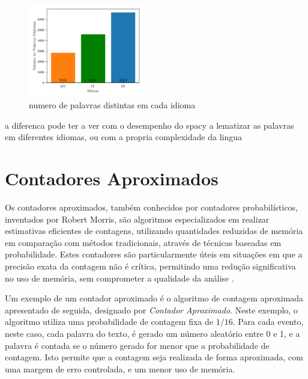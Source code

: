 \documentclass[mirror, portugues]{revdetua}
\begin{document}
\begin{figure}[H]
    \centering
    \includegraphics[width=0.45\textwidth]{../assets/exact_distinct_words.png}
    \caption{numero de palavras distintas em cada idioma}
    \label{fig:distinc_words}
\end{figure}

a diferenca pode ter a ver com o desempenho do spacy a lematizar as palavras em diferentes idiomas, ou com a propria complexidade da lingua 






\section{Contadores Aproximados}

Os contadores aproximados, também conhecidos por contadores probabilísticos, inventados por Robert Morris, são algoritmos especializados em realizar estimativas eficientes de contagens, utilizando quantidades reduzidas de memória em comparação com métodos tradicionais, através de técnicas baseadas em probabilidade. Estes contadores são particularmente úteis em situações em que a precisão exata da contagem não é crítica, permitindo uma redução significativa no uso de memória, sem comprometer a qualidade da análise \cite{RM78}.

Um exemplo de um contador aproximado é o algoritmo de contagem aproximada apresentado de seguida, designado por \textit{Contador Aproximado}. Neste exemplo, o algoritmo utiliza uma probabilidade de contagem fixa de $1/16$. Para cada evento, neste caso, cada palavra do texto, é gerado um número aleatório entre 0 e 1, e a palavra é contada se o número gerado for menor que a probabilidade de contagem. Isto permite que a contagem seja realizada de forma aproximada, com uma margem de erro controlada, e um menor uso de memória.
\end{document}
